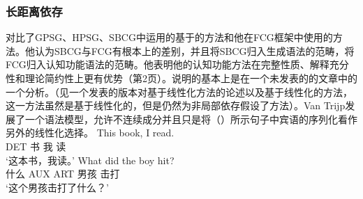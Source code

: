 \subsubsection{长距离依存}
\label{sec-fcg-nld}

{} 对比了GPSG、HPSG、SBCG中运用的基于\slaschc 的方法和他在FCG框架中使用的方法。他认为SBCG与FCG有根本上的差别，并且将SBCG归入生成语法的范畴，将FCG归入认知功能语法的范畴。他表明他的认知功能方法在完整性质、解释充分性和理论简约性上更有优势（第2页）。\citet{vanTrijp2014a}说明的基本上是\citet{Reape2000a}在一个未发表的的文章中的一个分析。（见一个发表的版本对基于线性化方法的论述以及基于线性化的方法，这一方法虽然是基于线性化的，但是仍然为非局部依存假设了\slaschc 方法）。Van Trijp发展了一个语法模型，允许不连续成分并且只是将（）所示句子中宾语的序列化看作另外的线性化选择。
\eal
\ex 
\gll This book, I read.\\  
    DET 书 我 读\\
\glt `这本书，我读。'
\ex 
\gll What did the boy hit?\\  
    什么 AUX ART 男孩 击打\\
\glt `这个男孩击打了什么？'
\zl
